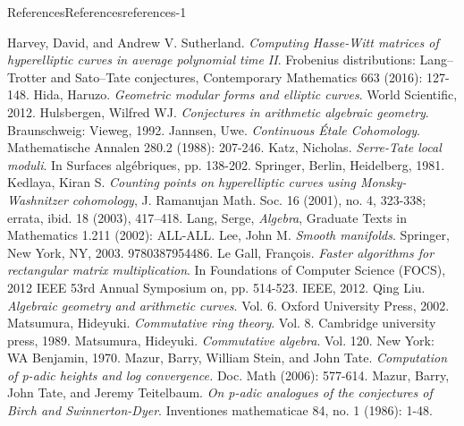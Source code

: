 \documentclass[oneside,10pt,]{book}
\numberwithin{equation}{section}
\begin{document}
\begin{references-chapter-numberless}{References}{}{References}{}{}{references-1}
\begin{thebibliography}{9}
\hypertarget{bib-harvey-sutherland-ii}{}Harvey, David, and Andrew V. Sutherland. \textit{Computing Hasse-Witt matrices of hyperelliptic curves in average polynomial time II}. Frobenius distributions: Lang–Trotter and Sato–Tate conjectures, Contemporary Mathematics 663 (2016): 127-148.
\hypertarget{bib-hida-geometric}{}Hida, Haruzo. \textit{Geometric modular forms and elliptic curves}. World Scientific, 2012.
\hypertarget{bib-hulsbergen}{}Hulsbergen, Wilfred WJ. \textit{Conjectures in arithmetic algebraic geometry}. Braunschweig: Vieweg, 1992.
\hypertarget{bib-jannsen}{}Jannsen, Uwe. \textit{Continuous Étale Cohomology}. Mathematische Annalen 280.2 (1988): 207-246.
\hypertarget{bib-katz-serre-tate}{}Katz, Nicholas. \textit{Serre-Tate local moduli}. In Surfaces algébriques, pp. 138-202. Springer, Berlin, Heidelberg, 1981.
\hypertarget{bib-kedlaya-counting}{}Kedlaya, Kiran S. \textit{Counting points on hyperelliptic curves using Monsky-Washnitzer cohomology}, J. Ramanujan Math. Soc. 16 (2001), no. 4, 323-338; errata, ibid. 18 (2003), 417--418.
\hypertarget{bib-lang-algebra}{}Lang, Serge,  \textit{Algebra}, Graduate Texts in Mathematics 1.211 (2002): ALL-ALL.
\hypertarget{bib-lee-smooth}{}Lee, John M. \textit{Smooth manifolds}. Springer, New York, NY, 2003. 9780387954486.
\hypertarget{bib-le-gall}{}Le Gall, François. \textit{Faster algorithms for rectangular matrix multiplication}. In Foundations of Computer Science (FOCS), 2012 IEEE 53rd Annual Symposium on, pp. 514-523. IEEE, 2012.
\hypertarget{bib-liu}{}Qing Liu. \textit{Algebraic geometry and arithmetic curves}. Vol. 6. Oxford University Press, 2002.
\hypertarget{bib-matsumura}{}Matsumura, Hideyuki. \textit{Commutative ring theory}. Vol. 8. Cambridge university press, 1989.
\hypertarget{bib-matsumura-algebra}{}Matsumura, Hideyuki. \textit{Commutative algebra}. Vol. 120. New York: WA Benjamin, 1970.
\hypertarget{bib-mazur-stein-tate}{}Mazur, Barry, William Stein, and John Tate. \textit{Computation of p-adic heights and log convergence.} Doc. Math (2006): 577-614.
\hypertarget{bib-mtt}{}Mazur, Barry, John Tate, and Jeremy Teitelbaum. \textit{On p-adic analogues of the conjectures of Birch and Swinnerton-Dyer}. Inventiones mathematicae 84, no. 1 (1986): 1-48.

\end{thebibliography}
\end{references-chapter-numberless}
\end{document}
